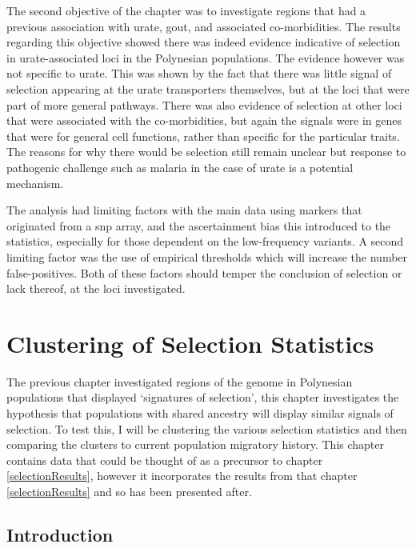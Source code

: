 \documentclass[]{report}
\begin{document}
The second objective of the chapter was to investigate regions that had
a previous association with urate, gout, and associated co-morbidities.
The results regarding this objective showed there was indeed evidence
indicative of selection in urate-associated loci in the Polynesian
populations. The evidence however was not specific to urate. This was
shown by the fact that there was little signal of selection appearing at
the urate transporters themselves, but at the loci that were part of
more general pathways. There was also evidence of selection at other
loci that were associated with the co-morbidities, but again the signals
were in genes that were for general cell functions, rather than specific
for the particular traits. The reasons for why there would be selection
still remain unclear but response to pathogenic challenge such as
malaria in the case of urate is a potential mechanism.

The analysis had limiting factors with the main data using markers that
originated from a \gls{snp} array, and the ascertainment bias this
introduced to the statistics, especially for those dependent on the
low-frequency variants. A second limiting factor was the use of
empirical thresholds which will increase the number false-positives.
Both of these factors should temper the conclusion of selection or lack
thereof, at the loci investigated.

\chapter{Clustering of Selection Statistics}\label{clustering}

\glsresetall

The previous chapter investigated regions of the genome in Polynesian
populations that displayed `signatures of selection', this chapter
investigates the hypothesis that populations with shared ancestry will
display similar signals of selection. To test this, I will be clustering
the various selection statistics and then comparing the clusters to
current population migratory history. This chapter contains data that
could be thought of as a precursor to chapter \ref{selectionResults},
however it incorporates the results from that chapter
\ref{selectionResults} and so has been presented after.

\section{Introduction}\label{chap4Intro}
\end{document}
